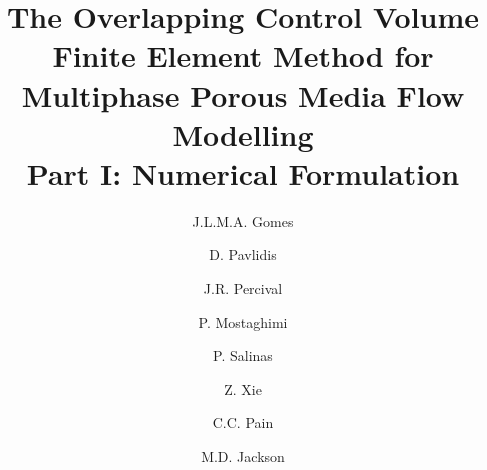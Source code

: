 \documentclass[preprint,authoryear,12pt]{elsarticle}
\begin{document}
\begin{frontmatter}



\title{The Overlapping Control Volume Finite Element Method for Multiphase Porous Media Flow Modelling \\
Part I: Numerical Formulation}

\author[UoA]{J.L.M.A. Gomes} \author[IC]{D. Pavlidis} 
\author[IC]{J.R. Percival} \author[NSW]{P. Mostaghimi} \author[IC,NORMS]{P. Salinas} \author[IC]{Z. Xie} 
\author[IC]{C.C. Pain} \author[NORMS]{M.D. Jackson}

\address[UoA]{Environmental and Industrial Fluid Mechanics Group, School of Engineering, University of Aberdeen, UK}
\address[IC]{Applied Modelling and Computation Group, Department of Earth Science and Engineering, Imperial College London, UK}
\address[NSW]{School of Petroleum Engineering, University of New South Wales, Australia}
\address[NORMS]{Novel Reservoir Modelling and Simulation Group, Department of Earth Science and Engineering, Imperial College London, UK}


\end{frontmatter}
\end{document}

